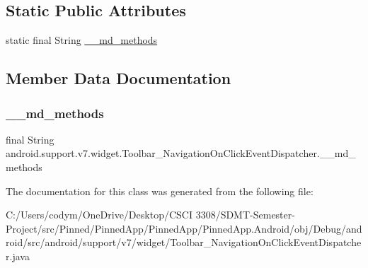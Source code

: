 \subsection*{Static Public Attributes}
\begin{DoxyCompactItemize}
\item 
static final String \hyperlink{classandroid_1_1support_1_1v7_1_1widget_1_1_toolbar___navigation_on_click_event_dispatcher_a97c82ce49b45088298de714d868899df}{\+\_\+\+\_\+md\+\_\+methods}
\end{DoxyCompactItemize}


\subsection{Member Data Documentation}
\mbox{\label{classandroid_1_1support_1_1v7_1_1widget_1_1_toolbar___navigation_on_click_event_dispatcher_a97c82ce49b45088298de714d868899df}} 
\subsubsection{\texorpdfstring{\+\_\+\+\_\+md\+\_\+methods}{\_\_md\_methods}}
{\footnotesize\ttfamily final String android.\+support.\+v7.\+widget.\+Toolbar\+\_\+\+Navigation\+On\+Click\+Event\+Dispatcher.\+\_\+\+\_\+md\+\_\+methods\hspace{0.3cm}{\ttfamily [static]}}



The documentation for this class was generated from the following file\+:\begin{DoxyCompactItemize}
\item 
C\+:/\+Users/codym/\+One\+Drive/\+Desktop/\+C\+S\+C\+I 3308/\+S\+D\+M\+T-\/\+Semester-\/\+Project/src/\+Pinned/\+Pinned\+App/\+Pinned\+App/\+Pinned\+App.\+Android/obj/\+Debug/android/src/android/support/v7/widget/Toolbar\+\_\+\+Navigation\+On\+Click\+Event\+Dispatcher.\+java\end{DoxyCompactItemize}
